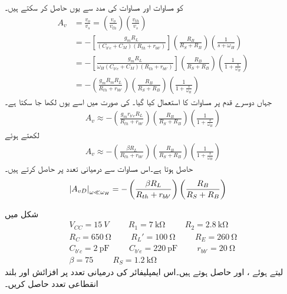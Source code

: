  کو مساوات  اور مساوات  کی مدد سے یوں حاصل کر سکتے ہیں۔
\begin{align*}
A_v&=\frac{v_o}{v_s}=\left (\frac{v_o}{v_{th}} \right)  \left(\frac{v_{th}}{v_s} \right)\\
&=-\left[\frac{g_m R_L}{\left(C_{b'e}+C_M \right) \left(R_{th}+r_{bb'} \right)}\right] \left(\frac{R_B}{R_S+R_B} \right)\left(\frac{1}{s+\omega_H} \right) \\
&=-\left[\frac{g_m R_L}{\omega_H \left(C_{b'e}+C_M \right) \left(R_{th}+r_{bb'} \right)}\right] \left(\frac{R_B}{R_S+R_B} \right)\left(\frac{1}{1+\frac{s}{\omega_H}} \right)\\
&=-\left(\frac{g_m R_m R_L}{R_{th}+r_{bb'}}\right) \left(\frac{R_B}{R_S+R_B} \right)\left(\frac{1}{1+\frac{s}{\omega_H}} \right)
\end{align*}
جہاں دوسرے قدم پر مساوات  کا استعمال کیا گیا۔ کی صورت میں اسے یوں لکھا جا سکتا ہے۔
\begin{align*}
A_v \approx -\left(\frac{g_m r_{b'e} R_L}{R_{th}+r_{bb'}}\right) \left(\frac{R_B}{R_S+R_B} \right)\left(\frac{1}{1+\frac{s}{\omega_H}} \right)
\end{align*}
 لکھتے ہوئے
\begin{align}  \label{مساوات_تعددی_ردعمل_مکمل_افزائش_مساوات}
A_v \approx -\left(\frac{\beta R_L}{R_{th}+r_{bb'}}\right) \left(\frac{R_B}{R_S+R_B} \right)\left(\frac{1}{1+\frac{s}{\omega_H}} \right)
\end{align}
حاصل ہوتا ہے۔اس مساوات سے درمیانی تعدد پر  حاصل کرتے ہیں۔
\begin{align} \label{مساوات_تعددی_ردعمل_درمیانی_تعدد_حتمی_افزائش}
\abs{A_{vD}}_{\omega \ll \omega_H}&=-\left(\frac{\beta R_L}{R_{th}+r_{bb'}}\right) \left(\frac{R_B}{R_S+R_B} \right)
\end{align}

شکل  میں
\begin{align*}
V_{CC}=\SI{15}{V} \hspace{1cm} R_1=\SI{7}{\kilo \ohm} \hspace{1cm} R_2=\SI{2.8}{\kilo \ohm}\\
R_C=\SI{650}{\ohm} \hspace{1cm} R_L'=\SI{100}{\ohm}  \hspace{1cm} R_E=\SI{260}{\ohm} \\
C_{b'c}=\SI{2}{\pico \farad} \hspace{1cm} C_{b'e}=\SI{220}{\pico \farad} \hspace{1cm} r_{bb'}=\SI{20}{\ohm}\\
\beta=\num{75} \hspace{1cm} R_S=\SI{1.2}{\kilo \ohm}
\end{align*}
لیتے ہوئے ،  اور  حاصل ہوتے ہیں۔اس ایمپلیفائر کی درمیانی تعدد پر افزائش  اور بلند انقطاعی تعدد  حاصل کریں۔

